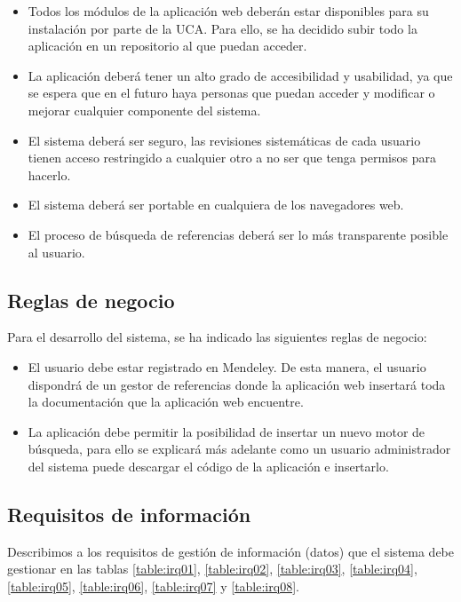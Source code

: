 \begin{itemize}
	\item Todos los módulos de la aplicación web deberán estar disponibles para su instalación por parte de la UCA. Para ello, se ha decidido subir todo la aplicación en un repositorio al que puedan acceder.
	\item La aplicación deberá tener un alto grado de accesibilidad y usabilidad, ya que se espera que en el futuro haya personas que puedan acceder y modificar o mejorar cualquier componente del sistema.
	\item El sistema deberá ser seguro, las revisiones sistemáticas de cada usuario tienen acceso restringido a cualquier otro a no ser que tenga permisos para hacerlo.
	\item El sistema deberá ser portable en cualquiera de los navegadores web.
	\item El proceso de búsqueda de referencias deberá ser lo más transparente posible al usuario.
\end{itemize}

\subsection{Reglas de negocio}
Para el desarrollo del sistema, se ha indicado las siguientes reglas de negocio:

\begin{itemize}
	\item El usuario debe estar registrado en Mendeley. De esta manera, el usuario dispondrá de un gestor de referencias donde la aplicación web insertará toda la documentación que la aplicación web encuentre.
	\item La aplicación debe permitir la posibilidad de insertar un nuevo motor de búsqueda, para ello se explicará más adelante como un usuario administrador del sistema puede descargar el código de la aplicación e insertarlo.
\end{itemize}

\subsection{Requisitos de información}
Describimos a los requisitos de gestión de información (datos) que el sistema debe gestionar en las tablas \ref{table:irq01}, \ref{table:irq02}, \ref{table:irq03}, \ref{table:irq04}, \ref{table:irq05}, \ref{table:irq06}, \ref{table:irq07} y \ref{table:irq08}.

